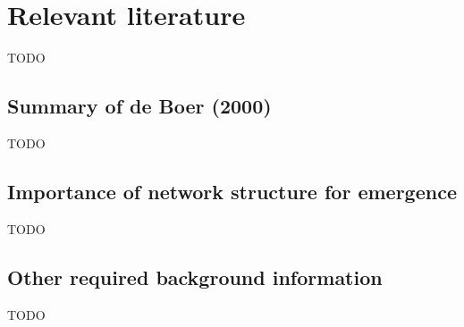 \chapter{Relevant literature}
\label{ch:literature}

TODO


\section{Summary of de Boer (2000)}
\label{sec:literature_db2000}

TODO


\section{Importance of network structure for emergence}
\label{sec:literature_emergence}

TODO


\section{Other required background information}
\label{sec:literature_background}

TODO